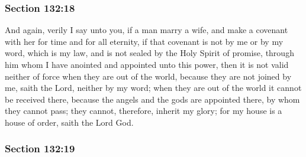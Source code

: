 
	\subsubsection{Section 132:18} %
		\label{DC132-18}

		And again, verily I say unto you, if a man marry a wife, and make a covenant with her for time and for all eternity, if that covenant is not by me or by my word, which is my law, and is not sealed by the Holy Spirit of promise, through him whom I have anointed and appointed unto this power, then it is not valid neither of force when they are out of the world, because they are not joined by me, saith the Lord, neither by my word; when they are out of the world it cannot be received there, because the angels and the gods are appointed there, by whom they cannot pass; they cannot, therefore, inherit my glory; for my house is a house of order, saith the Lord God.


	\subsubsection{Section 132:19} %
		\label{DC132-19}


